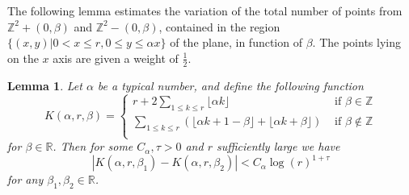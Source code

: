 \documentclass[12pt]{amsart}
\numberwithin{equation}{subsection}
\theoremstyle{definition}
\theoremstyle{plain}
\newtheorem{lemma}[equation]{Lemma}
\begin{document}
The following lemma estimates the variation of the total number of points from $\mathbb Z^2 + (0,\beta)$ and $\mathbb Z^2 - (0,\beta)$, contained in the region $\{(x,y)|0 < x \leq r,0 \leq y \leq \alpha x \}$ of the plane, in function of $\beta$.  The points lying on the $x$ axis are given a weight of $\frac{1}{2}$.

\begin{lemma}
\label{huxley}
Let $\alpha$ be a typical number, and define the following function
\[
K(\alpha,r,\beta)=
\begin{cases}
r +  2 \sum_{1 \leq k \leq r} \lfloor \alpha k \rfloor          & \text{ if } \beta \in \mathbb{Z} \\
\sum_{1 \leq k \leq r}  \left( \lfloor \alpha k + 1 - \beta \rfloor  + \lfloor \alpha k +\beta \rfloor \right)  & \text{ if } \beta \notin \mathbb{Z}\\
\end{cases}
\]
for $\beta \in \mathbb{R}$.
Then for some $C_{\alpha},\tau > 0$ and $r$ sufficiently large we have
\[
\left| K(\alpha,r,\beta_1) - K(\alpha,r,\beta_2) \right| < C_{\alpha} \log(r)^{1+\tau}
\]
for any $\beta_1,\beta_2 \in \mathbb{R}$.
\end{lemma}
\end{document}
